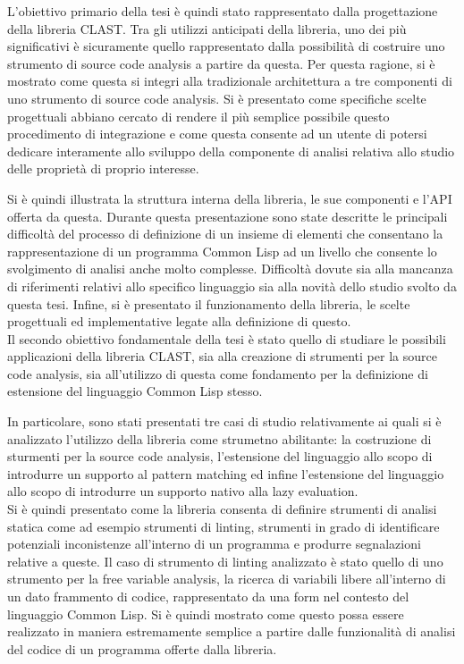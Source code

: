 \documentclass{book}
\begin{document}
L'obiettivo primario della tesi è quindi stato rappresentato dalla progettazione
della libreria CLAST. Tra gli utilizzi anticipati della libreria, uno dei più
significativi è sicuramente quello rappresentato dalla possibilità di costruire
uno strumento di source code analysis a partire da questa. Per questa ragione,
si è mostrato come questa si integri alla tradizionale architettura a tre
componenti di uno strumento di source code analysis. Si è presentato come
specifiche scelte progettuali abbiano cercato di rendere il più semplice
possibile questo procedimento di integrazione e come questa consente ad un
utente di potersi dedicare interamente allo sviluppo della componente di analisi
relativa allo studio delle proprietà di proprio interesse.

Si è quindi illustrata la struttura interna della libreria, le sue componenti e
l'API offerta da questa. Durante questa presentazione sono state descritte le
principali difficoltà del processo di definizione di un insieme di elementi che
consentano la rappresentazione di un programma Common Lisp ad un livello che
consente lo svolgimento di analisi anche molto complesse. Difficoltà dovute sia
alla mancanza di riferimenti relativi allo specifico linguaggio sia alla novità
dello studio svolto da questa tesi. Infine, si è presentato il funzionamento
della libreria, le scelte progettuali ed implementative legate alla definizione
di questo.\\

Il secondo obiettivo fondamentale della tesi è stato quello di studiare le
possibili applicazioni della libreria CLAST, sia alla creazione di strumenti per
la source code analysis, sia all'utilizzo di questa come fondamento per la
definizione di estensione del linguaggio Common Lisp stesso.

In particolare, sono stati presentati tre casi di studio relativamente ai quali
si è analizzato l'utilizzo della libreria come strumetno abilitante: la
costruzione di sturmenti per la source code analysis, l'estensione del
linguaggio allo scopo di introdurre un supporto al pattern matching ed infine
l'estensione del linguaggio allo scopo di introdurre un supporto nativo alla
lazy evaluation.\\

Si è quindi presentato come la libreria consenta di definire strumenti di
analisi statica come ad esempio strumenti di linting, strumenti in grado di
identificare potenziali inconistenze all'interno di un programma e produrre
segnalazioni relative a queste. Il caso di strumento di linting analizzato è
stato quello di uno strumento per la free variable analysis, la ricerca di
variabili libere all'interno di un dato frammento di codice, rappresentato da
una form nel contesto del linguaggio Common Lisp. Si è quindi mostrato come
questo possa essere realizzato in maniera estremamente semplice a partire dalle
funzionalità di analisi del codice di un programma offerte dalla libreria.\\
\end{document}
